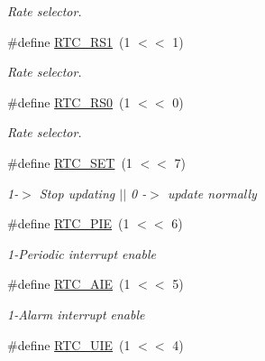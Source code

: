 \begin{DoxyCompactItemize}
\begin{DoxyCompactList}\small\item\em Rate selector. \end{DoxyCompactList}\item 
\hypertarget{group___r_t_c_gaf2b4f805675fd966c3c4173780b7b15b}{\#define \hyperlink{group___r_t_c_gaf2b4f805675fd966c3c4173780b7b15b}{R\-T\-C\-\_\-\-R\-S1}~(1 $<$$<$ 1)}\label{group___r_t_c_gaf2b4f805675fd966c3c4173780b7b15b}

\begin{DoxyCompactList}\small\item\em Rate selector. \end{DoxyCompactList}\item 
\hypertarget{group___r_t_c_ga722a880e324ceace4b3bd27d2a540404}{\#define \hyperlink{group___r_t_c_ga722a880e324ceace4b3bd27d2a540404}{R\-T\-C\-\_\-\-R\-S0}~(1 $<$$<$ 0)}\label{group___r_t_c_ga722a880e324ceace4b3bd27d2a540404}

\begin{DoxyCompactList}\small\item\em Rate selector. \end{DoxyCompactList}\item 
\hypertarget{group___r_t_c_gaac2db7539ba4f42b7a399faedc23df39}{\#define \hyperlink{group___r_t_c_gaac2db7539ba4f42b7a399faedc23df39}{R\-T\-C\-\_\-\-S\-E\-T}~(1 $<$$<$ 7)}\label{group___r_t_c_gaac2db7539ba4f42b7a399faedc23df39}

\begin{DoxyCompactList}\small\item\em 1-\/$>$ Stop updating $|$$|$ 0 -\/$>$ update normally \end{DoxyCompactList}\item 
\hypertarget{group___r_t_c_ga8aa3ee782d809767b9e03c49c7756083}{\#define \hyperlink{group___r_t_c_ga8aa3ee782d809767b9e03c49c7756083}{R\-T\-C\-\_\-\-P\-I\-E}~(1 $<$$<$ 6)}\label{group___r_t_c_ga8aa3ee782d809767b9e03c49c7756083}

\begin{DoxyCompactList}\small\item\em 1-\/\-Periodic interrupt enable \end{DoxyCompactList}\item 
\hypertarget{group___r_t_c_ga6a293d49e03a7f92a09cbb02fb49a08e}{\#define \hyperlink{group___r_t_c_ga6a293d49e03a7f92a09cbb02fb49a08e}{R\-T\-C\-\_\-\-A\-I\-E}~(1 $<$$<$ 5)}\label{group___r_t_c_ga6a293d49e03a7f92a09cbb02fb49a08e}

\begin{DoxyCompactList}\small\item\em 1-\/\-Alarm interrupt enable \end{DoxyCompactList}\item 
\hypertarget{group___r_t_c_ga3fa059415b73592c094cd9a3f79e6795}{\#define \hyperlink{group___r_t_c_ga3fa059415b73592c094cd9a3f79e6795}{R\-T\-C\-\_\-\-U\-I\-E}~(1 $<$$<$ 4)}\label{group___r_t_c_ga3fa059415b73592c094cd9a3f79e6795}


\end{DoxyCompactItemize}
